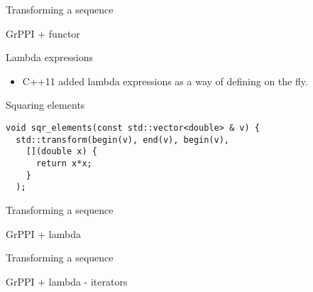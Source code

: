 \begin{frame}[t,fragile]{Transforming a sequence}
\begin{block}{GrPPI + functor}

\end{block}
\end{frame}

\begin{frame}[t,fragile]{Lambda expressions}
\begin{itemize}
  \item C++11 added lambda expressions as a way of defining on the fly.
\end{itemize}
\begin{block}{Squaring elements}
\begin{lstlisting}
void sqr_elements(const std::vector<double> & v) {
  std::transform(begin(v), end(v), begin(v),
    [](double x) { 
      return x*x; 
    }
  );
\end{lstlisting}
\end{block}
\end{frame}

\begin{frame}[t,fragile]{Transforming a sequence}
\begin{block}{GrPPI + lambda}

\end{block}
\end{frame}

\begin{frame}[t,fragile]{Transforming a sequence}
\begin{block}{GrPPI + lambda - iterators}

\end{block}
\end{frame}

